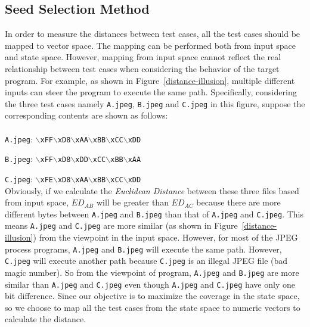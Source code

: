 \subsection{Seed Selection Method}
In order to measure the distances between test cases, all the test cases should be mapped to vector space. 
The mapping can be performed both from input space and state space. However, mapping from input space cannot reflect the real relationship between test cases when considering the behavior of the target program. For example, as shown in Figure~\ref{distance-illusion}, multiple different inputs can steer the program to execute the same path. Specifically, considering the three test cases namely \texttt{A.jpeg}, \texttt{B.jpeg} and \texttt{C.jpeg} in this figure, suppose the corresponding contents are shown as follows:
\\
\\
\indent\texttt{A.jpeg}: \texttt{$\backslash$xFF$\backslash$xD8$\backslash$xAA$\backslash$xBB$\backslash$xCC$\backslash$xDD}

\texttt{B.jpeg}: \texttt{$\backslash$xFF$\backslash$xD8$\backslash$xDD$\backslash$xCC$\backslash$xBB$\backslash$xAA}

\texttt{C.jpeg}: \texttt{$\backslash$xFE$\backslash$xD8$\backslash$xAA$\backslash$xBB$\backslash$xCC$\backslash$xDD}
\\

\indent Obviously, if we calculate the \textit{Euclidean Distance} between these three files based from input space, $ED_{AB}$ will be greater than $ED_{AC}$ because there are more different bytes between \texttt{A.jpeg} and \texttt{B.jpeg} than that of \texttt{A.jpeg} and \texttt{C.jpeg}. This means \texttt{A.jpeg} and \texttt{C.jpeg} are more similar (as shown in Figure~\ref{distance-illusion}) from the viewpoint in the input space. 
However, for most of the JPEG process programs, \texttt{A.jpeg} and \texttt{B.jpeg} will execute the same path. However, \texttt{C.jpeg} will execute another path because \texttt{C.jpeg} is an illegal JPEG file (bad magic number). So from the viewpoint of program, \texttt{A.jpeg} and \texttt{B.jpeg} are more similar than \texttt{A.jpeg} and \texttt{C.jpeg} even though \texttt{A.jpeg} and \texttt{C.jpeg} have only one bit difference. 
Since our objective is to maximize the coverage in the state space, so we choose to map all the test cases from the state space to numeric vectors to calculate the distance.

